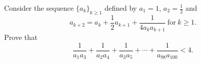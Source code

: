 Consider the sequence $\{a_k\}_{k \geq 1}$ defined by $a_1 = 1$,  $a_2 = \frac{1}{2}$ and \[ a_{k + 2} = a_k + \frac{1}{2}a_{k + 1} + \frac{1}{4a_ka_{k + 1}}\ \textrm{for}\ k \geq 1. \] Prove that \[ \frac{1}{a_1a_3} + \frac{1}{a_2a_4} + \frac{1}{a_3a_5} + \cdots + \frac{1}{a_{98}a_{100}} < 4. \]